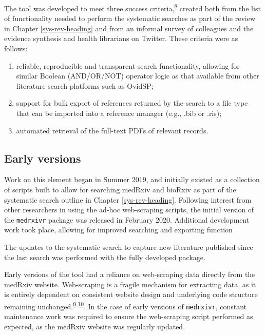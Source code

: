 \documentclass[a4paper, twoside]{templates/ociamthesis}
\providecommand{\tightlist}{%
  \setlength{\itemsep}{0pt}\setlength{\parskip}{0pt}}
\begin{document}
The tool was developed to meet three success criteria,\textsuperscript{\protect\hyperlink{ref-wateridge1995}{8}} created both from the list of functionality needed to perform the systematic searches as part of the review in Chapter \ref{sys-rev-heading} and from an informal survey of colleagues and the evidence synthesis and health librarians on Twitter. These criteria were as follows:

\begin{enumerate}
\def\labelenumi{\arabic{enumi}.}
\tightlist
\item
  reliable, reproducible and transparent search functionality, allowing for similar Boolean (AND/OR/NOT) operator logic as that available from other literature search platforms such as OvidSP;\\
\item
  support for bulk export of references returned by the search to a file type that can be imported into a reference manager (e.g., .bib or .ris);\\
\item
  automated retrieval of the full-text PDFs of relevant records.
\end{enumerate}

\hypertarget{early-versions}{%
\subsection{Early versions}\label{early-versions}}

Work on this element began in Summer 2019, and initially existed as a collection of scripts built to allow for searching medRxiv and bioRxiv as part of the systematic search outline in Chapter \ref{sys-rev-heading}. Following interest from other researchers in using the ad-hoc web-scraping scripts, the initial version of the \texttt{medrxivr} package was released in February 2020. Additional development work took place, allowing for improved searching and exporting function

The updates to the systematic search to capture new literature published since the last search was performed with the fully developed package.

Early versions of the tool had a reliance on web-scraping data directly from the medRxiv website. Web-scraping is a fragile mechanism for extracting data, as it is entirely dependent on consistent website design and underlying code structure remaining unchanged.\textsuperscript{\protect\hyperlink{ref-shaw2002}{9},\protect\hyperlink{ref-laprie1992}{10}}. In the case of early versions of \texttt{medrxivr}, constant maintenance work was required to ensure the web-scraping script performed as expected, as the medRxiv website was regularly updated.
\end{document}
